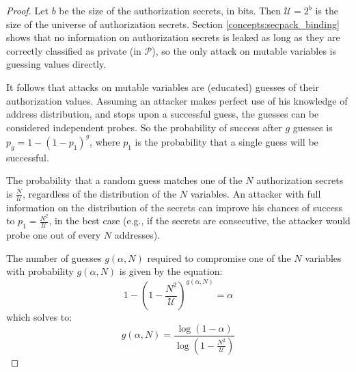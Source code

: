 \begin{proof}
Let $b$ be the size of the authorization secrets, in bits. Then
$\mathcal U = 2^b$ is the size of the universe of authorization secrets.
Section \ref{concepts:secpack_binding} shows that no information on
authorization secrets is leaked as long as they are correctly classified as
private (in $\mathcal P$), so the only attack on mutable variables is guessing
values directly.

It follows that attacks on mutable variables are (educated) guesses of their
authorization values. Assuming an attacker makes perfect use of his knowledge
of address distribution, and stops upon a successful guess, the guesses can be
considered independent probes. So the probability of success after $g$ guesses
is $p_g = 1 - (1 - p_1)^g$, where $p_1$ is the probability that a single
guess will be successful.

The probability that a random guess matches one of the $N$
authorization secrets is $\frac{N}{\mathcal U}$, regardless of the
distribution of the $N$ variables. An attacker with full information on the
distribution of the secrets can improve his chances of success to
$p_1 = \frac{N^2}{\mathcal U}$, in the best case (e.g., if the secrets are
consecutive, the attacker would probe one out of every $N$ addresses).

The number of guesses $g(\alpha, N)$ required to compromise one of the $N$
variables with probability $g(\alpha, N)$ is given by the equation:
$$ 1 - (1 - \frac{N^2}{\mathcal U})^{g(\alpha, N)} = \alpha $$
which solves to: $$g(\alpha, N) = \frac{\log(1 - \alpha)}{\log(1 -
\frac{N^2}{\mathcal U})}$$


\end{proof}
